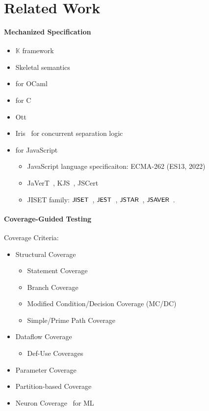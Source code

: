 \section{Related Work}\label{sec:related}

\paragraph{\textbf{Mechanized Specification}}

\begin{itemize}
  \item $\mathbb{K}$ framework~\cite{kframework}
  \item Skeletal semantics~\cite{skel}
  \item for OCaml~\cite{ocaml-light-spec}
  \item for C~\cite{c-light-spec}
  \item Ott~\cite{ott}
  \item Iris~\cite{iris} for concurrent separation logic
  \item for JavaScript
    \begin{itemize}
      \item JavaScript language specificaiton: ECMA-262 (ES13, 2022)~\cite{es13}
      \item JaVerT~\cite{javert, javert2}, KJS~\cite{kjs}, JSCert~\cite{jscert}
      \item JISET family: $\textsf{\small JISET}$~\cite{jiset}, $\textsf{\small JEST}$~\cite{jest},
        $\textsf{\small JSTAR}$~\cite{jstar}, $\textsf{\small JSAVER}$~\cite{jsaver}.
    \end{itemize}
\end{itemize}

\todo

\paragraph{\textbf{Coverage-Guided Testing}}

Coverage Criteria:
\begin{itemize}
  \item Structural Coverage
    \begin{itemize}
      \item Statement Coverage
      \item Branch Coverage
      \item Modified Condition/Decision Coverage (MC/DC)~\cite{cov-mcdc}
      \item Simple/Prime Path Coverage~\cite{cov-def}
    \end{itemize}
  \item Dataflow Coverage~\cite{cov-dataflow}
    \begin{itemize}
      \item Def-Use Coverages
    \end{itemize}
  \item Parameter Coverage~\cite{cov-param}
  \item Partition-based Coverage~\cite{cov-partition}
  \item Neuron Coverage~\cite{cov-neuron, cov-k-neuron} for ML
\end{itemize}

